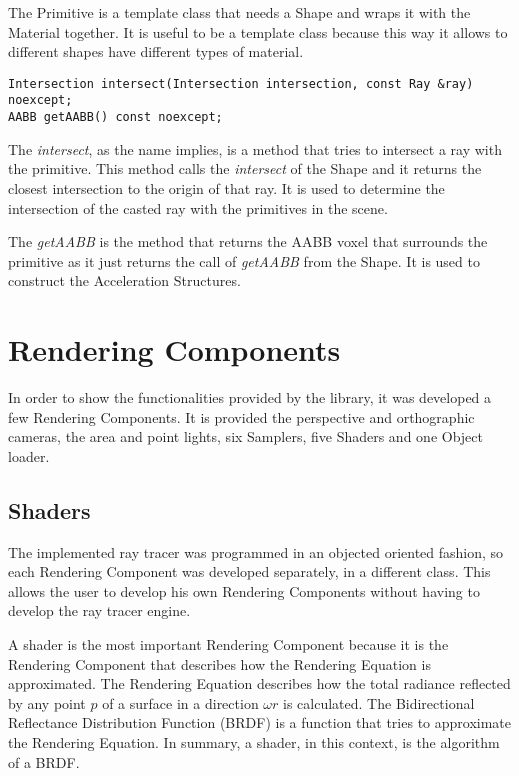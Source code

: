 \par
The Primitive is a template class that needs a Shape and wraps it with the Material together.
It is useful to be a template class because this way it allows to different shapes have different types of material.

\begin{lstlisting}[caption={Main methods in Primitive}, captionpos=b, label=Primitive]
Intersection intersect(Intersection intersection, const Ray &ray) noexcept;
AABB getAABB() const noexcept;
\end{lstlisting}

\par
The \textit{intersect}, as the name implies, is a method that tries to intersect a ray with the primitive.
This method calls the \textit{intersect} of the Shape and it returns the closest intersection to the origin of that ray.
It is used to determine the intersection of the casted ray with the primitives in the scene.

\par
The \textit{getAABB} is the method that returns the AABB voxel that surrounds the primitive as it just returns the call of \textit{getAABB} from the Shape.
It is used to construct the Acceleration Structures.


\section{Rendering Components}

\par
In order to show the functionalities provided by the library, it was developed a few Rendering Components.
It is provided the perspective and orthographic cameras, the area and point lights, six Samplers, five Shaders and one Object loader.

\subsection{Shaders}

\par
The implemented ray tracer was programmed in an objected oriented fashion, so each Rendering Component was developed separately, in a different class.
This allows the user to develop his own Rendering Components without having to develop the ray tracer engine.

\par
A shader is the most important Rendering Component because it is the Rendering Component that describes how the Rendering Equation is approximated.
The Rendering Equation describes how the total radiance reflected by any point
$p$
of a surface in a direction
$\omega$$r$
is calculated.
The Bidirectional Reflectance Distribution Function (BRDF) is a function that tries to approximate the Rendering Equation.
In summary, a shader, in this context, is the algorithm of a BRDF.

